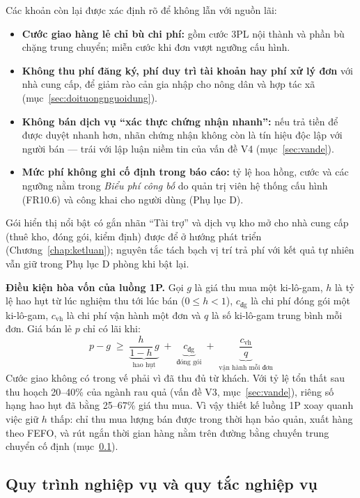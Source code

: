 Các khoản còn lại được xác định rõ để không lẫn với nguồn lãi:
\begin{itemize}
    \item \textbf{Cước giao hàng lẻ chỉ bù chi phí:} gồm cước 3PL nội thành và phần bù chặng trung chuyển; miễn cước khi đơn vượt ngưỡng cấu hình.
    \item \textbf{Không thu phí đăng ký, phí duy trì tài khoản hay phí xử lý đơn} với nhà cung cấp, để giảm rào cản gia nhập cho nông dân và hợp tác xã (mục~\ref{sec:doituongnguoidung}).
    \item \textbf{Không bán dịch vụ ``xác thực chứng nhận nhanh'':} nếu trả tiền để được duyệt nhanh hơn, nhãn chứng nhận không còn là tín hiệu độc lập với người bán --- trái với lập luận niềm tin của vấn đề V4 (mục~\ref{sec:vande}).
    \item \textbf{Mức phí không ghi cố định trong báo cáo:} tỷ lệ hoa hồng, cước và các ngưỡng nằm trong \emph{Biểu phí công bố} do quản trị viên hệ thống cấu hình (FR10.6) và công khai cho người dùng (Phụ lục D).
\end{itemize}

Gói hiển thị nổi bật có gắn nhãn ``Tài trợ'' và dịch vụ kho mở cho nhà cung cấp (thuê kho, đóng gói, kiểm định) được để ở hướng phát triển (Chương~\ref{chap:ketluan}); nguyên tắc tách bạch vị trí trả phí với kết quả tự nhiên vẫn giữ trong Phụ lục D phòng khi bật lại.

\noindent\textbf{Điều kiện hòa vốn của luồng 1P.} Gọi $g$ là giá thu mua một ki-lô-gam, $h$ là tỷ lệ hao hụt từ lúc nghiệm thu tới lúc bán ($0 \le h < 1$), $c_{\text{đg}}$ là chi phí đóng gói một ki-lô-gam, $c_{\text{vh}}$ là chi phí vận hành một đơn và $q$ là số ki-lô-gam trung bình mỗi đơn. Giá bán lẻ $p$ chỉ có lãi khi:
\[
p - g \;\ge\; \underbrace{\frac{h}{1-h}\,g}_{\text{hao hụt}} \;+\; \underbrace{c_{\text{đg}}}_{\text{đóng gói}} \;+\; \underbrace{\frac{c_{\text{vh}}}{q}}_{\text{vận hành mỗi đơn}}
\]
Cước giao không có trong vế phải vì đã thu đủ từ khách. Với tỷ lệ tổn thất sau thu hoạch 20--40\% của ngành rau quả (vấn đề V3, mục~\ref{sec:vande}), riêng số hạng hao hụt đã bằng 25--67\% giá thu mua. Vì vậy thiết kế luồng 1P xoay quanh việc giữ $h$ thấp: chỉ thu mua lượng bán được trong thời hạn bảo quản, xuất hàng theo FEFO, và rút ngắn thời gian hàng nằm trên đường bằng chuyến trung chuyển cố định (mục~\ref{sec:quytrinhnghiepvu}).



\subsection{Quy trình nghiệp vụ và quy tắc nghiệp vụ}
\label{sec:quytrinhnghiepvu}

